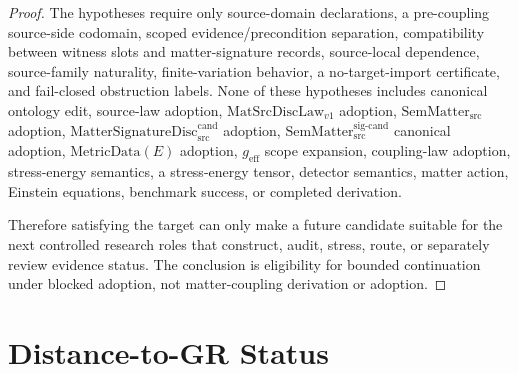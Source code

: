 \documentclass[11pt]{article}
\newcommand{\MetricData}{\mathrm{MetricData}}
\newcommand{\geff}{g_{\mathrm{eff}}}
\newcommand{\MatSrcDiscLaw}{\mathrm{MatSrcDiscLaw}_{v1}}
\newcommand{\SemMatterSrc}{\mathrm{SemMatter}_{\mathrm{src}}}
\newcommand{\SemMatterSig}{\mathrm{SemMatter}_{\mathrm{src}}^{\mathrm{sig\text{-}cand}}}
\newcommand{\MatSigDisc}{\mathrm{MatterSignatureDisc}_{\mathrm{src}}^{\mathrm{cand}}}
\begin{document}
\begin{proof}
The hypotheses require only source-domain declarations, a pre-coupling
source-side codomain, scoped evidence/precondition separation, compatibility
between witness slots and matter-signature records, source-local dependence,
source-family naturality, finite-variation behavior, a no-target-import
certificate, and fail-closed obstruction labels. None of these hypotheses
includes canonical ontology edit, source-law adoption, \(\MatSrcDiscLaw\)
adoption, \(\SemMatterSrc\) adoption, \(\MatSigDisc\) adoption,
\(\SemMatterSig\) canonical adoption, \(\MetricData(E)\) adoption,
\(\geff\) scope expansion, coupling-law adoption, stress-energy semantics,
a stress-energy tensor, detector semantics, matter action, Einstein
equations, benchmark success, or completed derivation.

Therefore satisfying the target can only make a future candidate suitable for
the next controlled research roles that construct, audit, stress, route, or
separately review evidence status. The conclusion is eligibility for bounded
continuation under blocked adoption, not matter-coupling derivation or
adoption.
\end{proof}

\section{Distance-to-GR Status}
\end{document}
